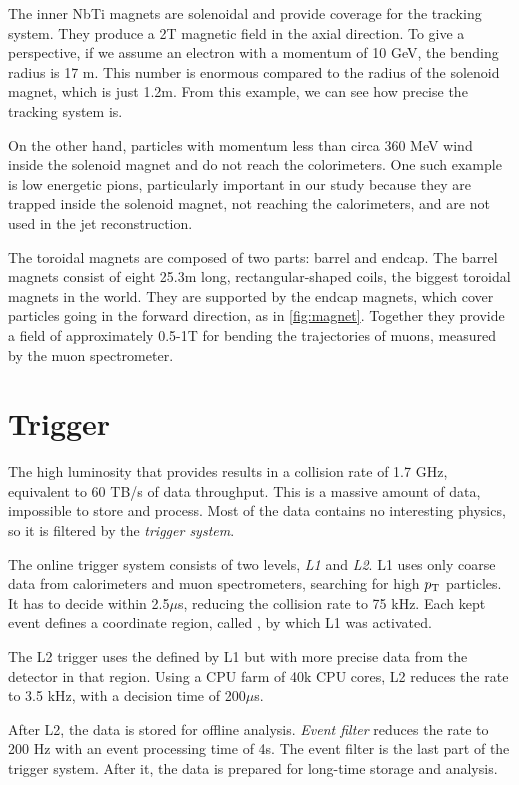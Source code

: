 The inner NbTi magnets are solenoidal and provide coverage for the tracking system.
They produce a 2T magnetic field in the axial direction.
To give a perspective, if we assume an electron with a momentum of 10 GeV, the bending radius is 17 m.
This number is enormous compared to the radius of the solenoid magnet, which is just 1.2m. 
From this example, we can see how precise the tracking system is.

On the other hand, particles with momentum less than circa 360 MeV wind inside the solenoid magnet and do not reach the colorimeters.
One such example is low energetic pions, particularly important in our study because they are trapped inside the solenoid magnet, not reaching the calorimeters, and are not used in the jet reconstruction.

The toroidal magnets are composed of two parts: barrel and endcap.
The barrel magnets consist of eight 25.3m long, rectangular-shaped coils, the biggest toroidal magnets in the world.
They are supported by the endcap magnets, which cover particles going in the forward direction, as in \cref{fig:magnet}.
Together they provide a field of approximately 0.5-1T for bending the trajectories of muons, measured by the muon spectrometer. 


\section{Trigger}
\label{sec:trigger}
The high luminosity that \LHC provides results in a collision rate of 1.7 GHz, equivalent to 60 TB/s of data throughput.
This is a massive amount of data, impossible to store and process.
Most of the data contains no interesting physics, so it is filtered by the \emph{trigger system}.

The online trigger system consists of two levels, \emph{L1} and \emph{L2}. 
L1 uses only coarse data from calorimeters and muon spectrometers, searching for high $p_\text{T}$ particles.
It has to decide within 2.5$\mu$s, reducing the collision rate to 75 kHz.
Each kept event defines a coordinate region, called \RoI, by which L1 was activated. 

The L2 trigger uses the \RoI defined by L1 but with more precise data from the detector in that region.
Using a CPU farm of 40k CPU cores, L2 reduces the rate to 3.5 kHz, with a decision time of 200$\mu$s.

After L2, the data is stored for offline analysis.
\emph{Event filter} reduces the rate to 200 Hz with an event processing time of 4s.
The event filter is the last part of the trigger system. 
After it, the data is prepared for long-time storage and analysis.
